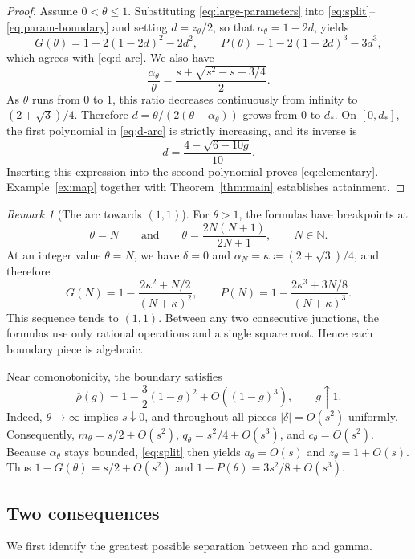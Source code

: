 \documentclass{article}
\theoremstyle{definition}
\theoremstyle{remark}
\newtheorem{remark}[theorem]{Remark}
\newcommand{\1}{\mathds{1}}
\newcommand{\rhoup}{\overline{\rho}}
\begin{document}
\begin{proof}
Assume $0<\theta\le1$. Substituting \eqref{eq:large-parameters} into
\eqref{eq:split}--\eqref{eq:param-boundary} and setting
$d=z_\theta/2$, so that $a_\theta=1-2d$, yields
\[
G(\theta)=1-2(1-2d)^2-2d^2,
\qquad
P(\theta)=1-2(1-2d)^3-3d^3,
\]
which agrees with \eqref{eq:d-arc}. We also have
\[
\frac{\alpha_\theta}{\theta}
=\frac{s+\sqrt{s^2-s+3/4}}2.
\]
As $\theta$ runs from $0$ to $1$, this ratio decreases continuously from
infinity to $(2+\sqrt3)/4$. Therefore
$d=\theta/(2(\theta+\alpha_\theta))$ grows from $0$ to $d_*$. On
$[0,d_*]$, the first polynomial in \eqref{eq:d-arc} is strictly increasing,
and its inverse is
\[
d=\frac{4-\sqrt{6-10g}}{10}.
\]
Inserting this expression into the second polynomial proves
\eqref{eq:elementary}. Example~\ref{ex:map} together with
Theorem~\ref{thm:main} establishes attainment.
\end{proof}

\begin{remark}[The arc towards $(1,1)$]\label{rem:anchors}
For $\theta>1$, the formulas have breakpoints at
\[
\theta=N
\qquad\text{and}\qquad
\theta=\frac{2N(N+1)}{2N+1},
\qquad N\in\mathbb N.
\]
At an integer value $\theta=N$, we have $\delta=0$ and
$\alpha_N=\kappa\coloneqq(2+\sqrt3)/4$, and therefore
\[
G(N)
=
1-\frac{2\kappa^2+N/2}{(N+\kappa)^2},
\qquad
P(N)
=
1-\frac{2\kappa^3+3N/8}{(N+\kappa)^3}.
\]
This sequence tends to $(1,1)$. Between any two consecutive junctions, the
formulas use only rational operations and a single square root. Hence each
boundary piece is algebraic.

Near comonotonicity, the boundary satisfies
\begin{equation}\label{eq:asymptotic}
\rhoup(g)
=
1-\frac32(1-g)^2+O((1-g)^3),
\qquad g\uparrow1.
\end{equation}
Indeed, $\theta\to\infty$ implies $s\downarrow0$, and throughout all pieces
$|\delta|=O(s^2)$ uniformly. Consequently,
$m_\theta=s/2+O(s^2)$, $q_\theta=s^2/4+O(s^3)$, and $c_\theta=O(s^2)$.
Because $\alpha_\theta$ stays bounded, \eqref{eq:split} then yields
$a_\theta=O(s)$ and $z_\theta=1+O(s)$. Thus
$1-G(\theta)=s/2+O(s^2)$ and $1-P(\theta)=3s^2/8+O(s^3)$.
\end{remark}

\subsection{Two consequences}

We first identify the greatest possible separation between rho and gamma.
\end{document}
